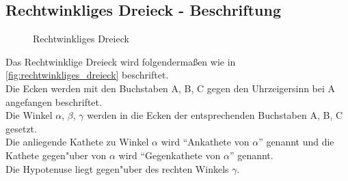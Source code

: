 \documentclass{standalone}
\begin{document}
\subsection{Rechtwinkliges Dreieck - Beschriftung}
\begin{figure}[hb!]
  \centering
  \def\svgwidth{200px}
  
  \caption{Rechtwinkliges Dreieck}
  \label{fig:rechtwinkliges_dreieck}
\end{figure}
\noindent
Das Rechtwinklige Dreieck wird folgenderma{\ss}en wie in \autoref{fig:rechtwinkliges_dreieck} beschriftet. \\
Die Ecken werden mit den Buchstaben A, B, C gegen den Uhrzeigersinn bei A angefangen beschriftet. \\
Die Winkel $\alpha$, $\beta$, $\gamma$ werden in die Ecken der entsprechenden Buchstaben A, B, C gesetzt. \\
Die anliegende Kathete zu Winkel $\alpha$ wird "`Ankathete von $\alpha$"' genannt und die Kathete gegen{"u}ber von $\alpha$ wird "`Gegenkathete von $\alpha$"' genannt. \\
Die Hypotenuse liegt gegen{"u}ber des rechten Winkels $\gamma$.
\end{document}
